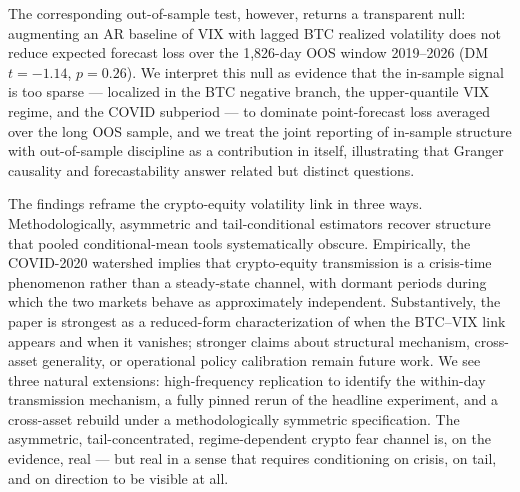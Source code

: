 \documentclass[11pt,a4paper]{article}
\begin{document}
The corresponding out-of-sample test, however, returns a transparent null: augmenting an AR baseline of VIX with lagged BTC realized volatility does not reduce expected forecast loss over the 1{,}826-day OOS window 2019--2026 (DM $t = -1.14$, $p = 0.26$). We interpret this null as evidence that the in-sample signal is too sparse --- localized in the BTC negative branch, the upper-quantile VIX regime, and the COVID subperiod --- to dominate point-forecast loss averaged over the long OOS sample, and we treat the joint reporting of in-sample structure with out-of-sample discipline as a contribution in itself, illustrating that Granger causality and forecastability answer related but distinct questions.

The findings reframe the crypto-equity volatility link in three ways. Methodologically, asymmetric and tail-conditional estimators recover structure that pooled conditional-mean tools systematically obscure. Empirically, the COVID-2020 watershed implies that crypto-equity transmission is a crisis-time phenomenon rather than a steady-state channel, with dormant periods during which the two markets behave as approximately independent. Substantively, the paper is strongest as a reduced-form characterization of when the BTC--VIX link appears and when it vanishes; stronger claims about structural mechanism, cross-asset generality, or operational policy calibration remain future work. We see three natural extensions: high-frequency replication to identify the within-day transmission mechanism, a fully pinned rerun of the headline experiment, and a cross-asset rebuild under a methodologically symmetric specification. The asymmetric, tail-concentrated, regime-dependent crypto fear channel is, on the evidence, real --- but real in a sense that requires conditioning on crisis, on tail, and on direction to be visible at all.
\end{document}
